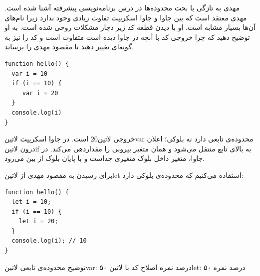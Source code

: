 
مهدی به تازگی با بحث محدوده‌ها
در درس برنامه‌نویسی پیشرفته آشنا شده است.
مهدی معتقد است که بین جاوا و جاوا اسکریپت تفاوت زیادی وجود ندارد زیرا نام‌های آن‌ها بسیار مشابه است.
او با دیدن قطعه کد زیر دچار مشکلات روحی شده است.
به او توضیح دهید که چرا خروجی کد با آنچه در جاوا دیده است متفاوت است
و کد را نیز به گونه‌ای تغییر دهید تا مقصود مهدی را برساند.

\begin{latin}
\begin{verbatim}
function hello() {
  var i = 10
  if (i == 10) {
     var i = 20
  }
  console.log(i)
}
\end{verbatim}
\end{latin}


\begin{پاسخ}

خروجی ‌لاتین{20} است.
در جاوا اسکریپت ‌لاتین{var} محدوده‌ی تابعی دارد نه بلوکی؛ اعلان درون ‌لاتین{if} به بالای تابع منتقل می‌شود و همان متغیر بیرونی را مقداردهی می‌کند.
در جاوا، متغیر داخل بلوک متغیری جداست و با پایان بلوک از بین می‌رود.

برای رسیدن به مقصود مهدی از ‌لاتین{let} استفاده می‌کنیم که محدوده‌ی بلوکی دارد:

\begin{latin}
\begin{verbatim}
function hello() {
  let i = 10;
  if (i == 10) {
    let i = 20;
  }
  console.log(i); // 10
}
\end{verbatim}
\end{latin}

 توضیح محدوده‌ی تابعی ‌لاتین{var}: ۵۰ درصد نمره
 اصلاح کد با ‌لاتین{let}: ۵۰ درصد نمره

\end{پاسخ}
